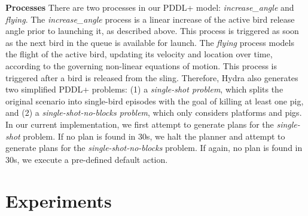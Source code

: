 \documentclass[letterpaper]{article} %
\begin{document}
\noindent\textbf{Processes}
There are two processes in our PDDL+ model: \textit{increase\_angle} and \textit{flying}.  The \textit{increase\_angle} process is a linear increase of the active bird release angle prior to launching it, as described above. This process is triggered as soon as the next bird in the queue is available for launch. %
The \textit{flying} process models the flight of the active bird, updating its velocity and location over time, according to the governing non-linear equations of motion. This process is triggered after a bird is released from the sling. %
Therefore, Hydra also generates two simplified PDDL+ problems:
(1) a \textit{single-shot problem}, which splits the original scenario into single-bird episodes with the goal of killing at least one pig, and (2) a \textit{single-shot-no-blocks problem}, which only considers platforms and pigs. In our current implementation, we first attempt to generate plans for the \textit{single-shot} problem.
If no plan is found in 30s, we halt the planner and attempt to generate plans for the \textit{single-shot-no-blocks} problem.
If again, no plan is found in 30s, we execute a pre-defined default action.
































\vspace{-1.80mm}
\section{Experiments}
\end{document}
